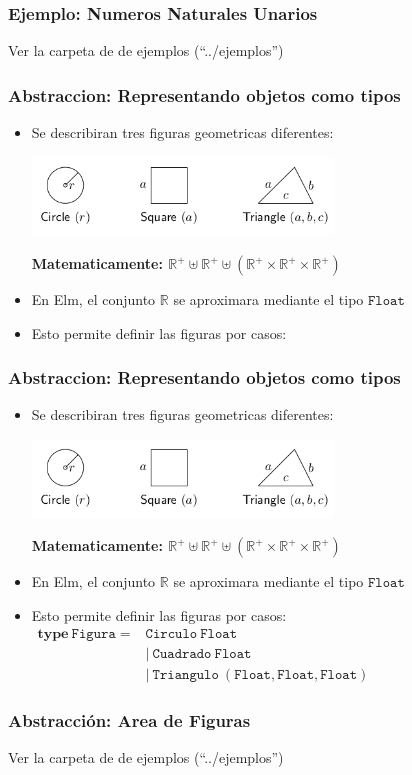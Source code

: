 \documentclass{beamer}
\begin{document}
\begin{frame}
\frametitle{Ejemplo: Numeros Naturales Unarios}
Ver la carpeta de de ejemplos (``../ejemplos'')
\end{frame}

\begin{frame}
    \frametitle{Abstraccion: Representando objetos como tipos}
    \begin{itemize}
        \item{Se describiran tres figuras geometricas diferentes:
        \begin{center}
            \includegraphics[width=8cm]{./figuras.png}
        \end{center}
        {\bf Matematicamente: $\mathbb{R^+}\uplus\mathbb{R^+}\uplus(\mathbb{R^+}\times\mathbb{R^+}\times\mathbb{R^+})$}
        }
        \item{En Elm, el conjunto $\mathbb{R}$ se aproximara mediante el tipo
        $\mathtt{Float}$}
        \item{Esto permite definir las figuras por casos:}
    \end{itemize}

\end{frame}

\begin{frame}
    \frametitle{Abstraccion: Representando objetos como tipos}
    \begin{itemize}
        \item{Se describiran tres figuras geometricas diferentes:
        \begin{center}
            \includegraphics[width=8cm]{./figuras.png}
        \end{center}
        {\bf Matematicamente: $\mathbb{R^+}\uplus\mathbb{R^+}\uplus(\mathbb{R^+}\times\mathbb{R^+}\times\mathbb{R^+})$}
        }
        \item{En Elm, el conjunto $\mathbb{R}$ se aproximara mediante el tipo
        $\mathtt{Float}$}
        \item{Esto permite definir las figuras por casos:\\
        $
        \begin{array}{ll}
            \mathbf{type}\ \mathtt{Figura=} & \mathtt{Circulo\ Float}\\
            & |\ \mathtt{Cuadrado\ Float} \\
            & |\ \mathtt{Triangulo\ (Float,Float,Float)}
        \end{array}    
        $}
    \end{itemize}

\end{frame}

\begin{frame}
\frametitle{Abstracci\'on: Area de Figuras}
Ver la carpeta de de ejemplos (``../ejemplos'')
\end{frame}
\end{document}
